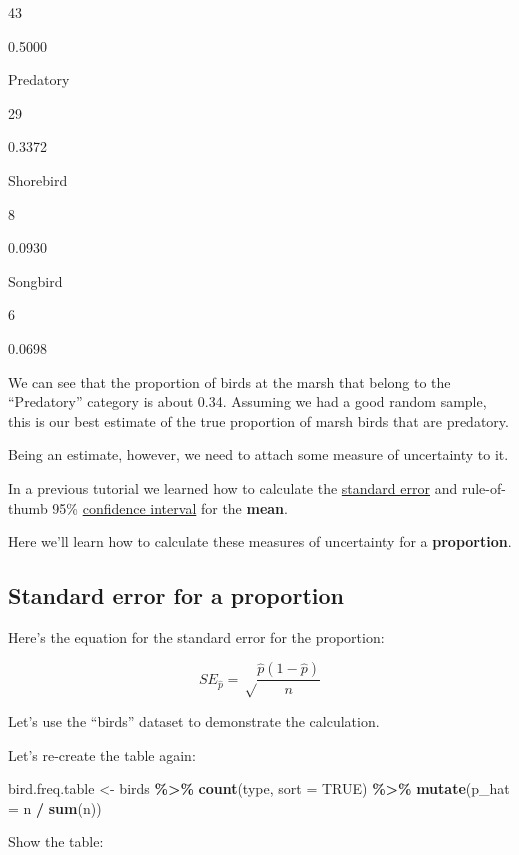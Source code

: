 \documentclass[
]{book}
\newenvironment{Shaded}{\begin{snugshade}}{\end{snugshade}}
\newcommand{\AttributeTok}[1]{\textcolor[rgb]{0.13,0.29,0.53}{#1}}
\newcommand{\ConstantTok}[1]{\textcolor[rgb]{0.56,0.35,0.01}{#1}}
\newcommand{\FunctionTok}[1]{\textcolor[rgb]{0.13,0.29,0.53}{\textbf{#1}}}
\newcommand{\NormalTok}[1]{#1}
\newcommand{\OtherTok}[1]{\textcolor[rgb]{0.56,0.35,0.01}{#1}}
\newcommand{\SpecialCharTok}[1]{\textcolor[rgb]{0.81,0.36,0.00}{\textbf{#1}}}
\begin{document}
43

0.5000

Predatory

29

0.3372

Shorebird

8

0.0930

Songbird

6

0.0698

We can see that the proportion of birds at the marsh that belong to the ``Predatory'' category is about 0.34. Assuming we had a good random sample, this is our best estimate of the true proportion of marsh birds that are predatory.

Being an estimate, however, we need to attach some measure of uncertainty to it.

In a previous tutorial we learned how to calculate the \hyperref[sem_page]{standard error} and rule-of-thumb 95\% \hyperref[confint_rough]{confidence interval} for the \textbf{mean}.

Here we'll learn how to calculate these measures of uncertainty for a \textbf{proportion}.

\subsection{Standard error for a proportion}\label{sterr_prop}

Here's the equation for the standard error for the proportion:

\[SE_\hat{p} = \sqrt\frac{\hat{p}(1-\hat{p})}{n}\]

Let's use the ``birds'' dataset to demonstrate the calculation.

Let's re-create the table again:

\begin{Shaded}
\begin{Highlighting}[]
\NormalTok{bird.freq.table }\OtherTok{\textless{}{-}}\NormalTok{ birds }\SpecialCharTok{\%\textgreater{}\%}
  \FunctionTok{count}\NormalTok{(type, }\AttributeTok{sort =} \ConstantTok{TRUE}\NormalTok{) }\SpecialCharTok{\%\textgreater{}\%} 
  \FunctionTok{mutate}\NormalTok{(}\AttributeTok{p\_hat =}\NormalTok{ n }\SpecialCharTok{/} \FunctionTok{sum}\NormalTok{(n))}
\end{Highlighting}
\end{Shaded}

Show the table:
\end{document}
